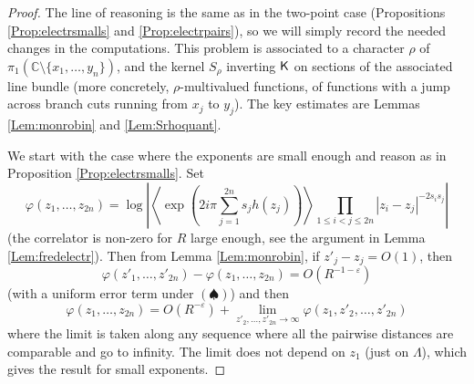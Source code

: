 \documentclass[10pt]{article}
\newcommand{\C}{\mathbb{C}}
\newcommand{\eps}{\varepsilon}
\newcommand{\rK}{{\sf K}}
\begin{document}
\begin{proof}
The line of reasoning is the same as in the two-point case (Propositions \ref{Prop:electrsmalls} and \ref{Prop:electrpairs}), so we will simply record the needed changes in the computations. This problem is associated to a character $\rho$ of $\pi_1(\C\setminus\{x_1,\dots,y_n\})$, and the kernel $S_\rho$ inverting $\rK$ on sections of the associated line bundle (more concretely, $\rho$-multivalued functions, of functions with a jump across branch cuts running from $x_j$ to $y_j$). The key estimates are Lemmas \ref{Lem:monrobin} and \ref{Lem:Srhoquant}.

We start with the case where the exponents are small enough and reason as in Proposition \ref{Prop:electrsmalls}. Set 
$$\varphi(z_1,\dots,z_{2n})=\log\left|\left\langle\exp(2i\pi\sum_{j=1}^{2n} s_jh(z_j))\right\rangle\prod_{1\leq i<j\leq 2n}|z_i-z_j|^{-2s_is_j}\right|$$
(the correlator is non-zero for $R$ large enough, see the argument in Lemma \ref{Lem:fredelectr}). Then from Lemma \ref{Lem:monrobin}, if $z'_j-z_j=O(1)$, then
$$\varphi(z'_1,\dots,z'_{2n})-\varphi(z_1,\dots,z_{2n})=O(R^{-1-\eps})$$
(with a uniform error term under $(\spadesuit)$) and then
$$\varphi(z_1,\dots,z_{2n})=O(R^{-\eps})+\lim_{z'_2,\dots,z'_{2n}\rightarrow\infty}\varphi(z_1,z'_2,\dots,z'_{2n})$$
where the limit is taken along any sequence where all the pairwise distances are comparable and go to infinity. The limit does not depend on $z_1$ (just on $\Lambda$), which gives the result for small exponents.


\end{proof}
\end{document}
